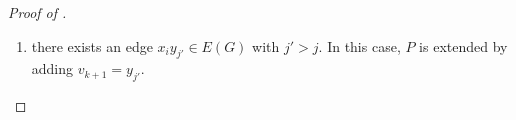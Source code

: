 \documentclass{patmorin}
\begin{document}
\begin{proof}[Proof of ]
\begin{enumerate}
  \item there exists an edge $x_i y_{j'}\in E(G)$ with $j' >j$.  In this case, $P$ is extended by adding $v_{k+1}=y_{j'}$.
  \end{enumerate}
%
%
%
%


\end{proof}
\end{document}
